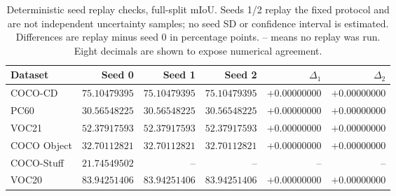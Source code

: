 \begin{table}[t]
\caption{Deterministic seed replay checks, full-split mIoU. Seeds 1/2 replay the fixed protocol and are not independent uncertainty samples; no seed SD or confidence interval is estimated. Differences are replay minus seed 0 in percentage points. -- means no replay was run. Eight decimals are shown to expose numerical agreement.}
\label{tab:seed-replay}
\centering\small
\begin{tabular}{@{}lrrrrr@{}}
\toprule
Dataset & Seed 0 & Seed 1 & Seed 2 & $\Delta_1$ & $\Delta_2$ \\
\midrule
COCO-CD & $75.10479395$ & $75.10479395$ & $75.10479395$ & $+0.00000000$ & $+0.00000000$ \\
PC60 & $30.56548225$ & $30.56548225$ & $30.56548225$ & $+0.00000000$ & $+0.00000000$ \\
VOC21 & $52.37917593$ & $52.37917593$ & $52.37917593$ & $+0.00000000$ & $+0.00000000$ \\
COCO Object & $32.70112821$ & $32.70112821$ & $32.70112821$ & $+0.00000000$ & $+0.00000000$ \\
COCO-Stuff & $21.74549502$ & -- & -- & -- & -- \\
VOC20 & $83.94251406$ & $83.94251406$ & $83.94251406$ & $+0.00000000$ & $+0.00000000$ \\
\bottomrule
\end{tabular}
\end{table}
